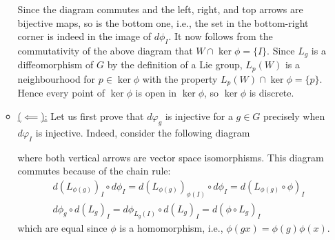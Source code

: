 \documentclass[a4paper, 12pt]{article}
\begin{document}
\begin{Exercise}
\begin{enumerate}[label=(\roman*)]
\begin{itemize}
                    Since the diagram commutes and the left, right, and top arrows are bijective maps,
                    so is the bottom one, i.e., the set in the bottom-right corner is indeed in the image of $d\phi_I$.
                    It now follows from the commutativity of the above diagram that $W \cap \ker\phi = \lbrace I \rbrace$.
                    Since $L_g$ is a diffeomorphism of $G$ by the definition of a Lie group,
                    $L_p(W)$ is a neighbourhood for $p \in \ker\phi$ with the property $L_p(W) \cap \ker\phi = \lbrace p \rbrace$.
                    Hence every point of $\ker\phi$ is open in $\ker\phi$, so $\ker\phi$ is discrete.
                \item \underline{($\impliedby$):}
                    Let us first prove that $d\varphi_g$ is injective for a $g \in G$ precisely when $d\varphi_I$ is injective.
                    Indeed, consider the following diagram

                    where both vertical arrows are vector space isomorphisms.
                    This diagram commutes because of the chain rule:
                    \begin{align*}
                        &d(L_{\phi(g)})_I \circ d\phi_I = d(L_{\phi(g)})_{\phi(I)}\circ d\phi_I = d(L_{\phi(g)} \circ \phi)_I \\
                        & d\phi_g \circ d(L_g)_I = d\phi_{L_g(I)} \circ d(L_g)_I = d(\phi \circ L_g)_I
                    \end{align*}
                    which are equal since $\phi$ is a homomorphism, i.e., $\phi(gx) = \phi(g)\phi(x)$.
                    

\end{itemize}
\end{enumerate}
\end{Exercise}
\end{document}
